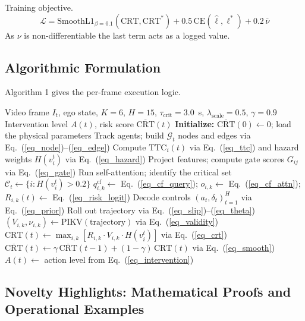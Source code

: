 \documentclass[preprint,12pt]{elsarticle}
\begin{document}
Training objective.
\begin{equation}
    \mathcal{L} = \text{SmoothL1}_{\beta = 0.1}(\text{CRT}, \text{CRT}^{*}) + 0.5 \, \text{CE}(\hat{\ell}, \ell^{*}) + 0.2 \, \overline{\nu}
    \label{eq_loss}
\end{equation}
As $\nu$ is non-differentiable the last term acts as a logged value.

\subsection{Algorithmic Formulation}
Algorithm 1 gives the per-frame execution logic.

\begin{algorithm}[H]
	\caption{PC-CSG Counterfactual Anomaly Anticipation Pipeline}
	\begin{algorithmic}[1]
		\Require Video frame $I_t$, ego state, $K=6$, $H=15$, $\tau_{\text{crit}}=3.0$~s, $\lambda_{\text{scale}}=0.5$, $\gamma = 0.9$
		\Ensure Intervention level $A(t)$, risk score $\overline{\text{CRT}}(t)$
		\State \textbf{Initialize:} $\overline{\text{CRT}}(0) \gets 0$; load the physical parameters
			\State Track agents; build $\mathcal{G}_t$ nodes and edges via Eq.~(\ref{eq_node})--(\ref{eq_edge})
			\State Compute $\text{TTC}_i(t)$ via Eq.~(\ref{eq_ttc}) and hazard weights $H(v_i^t)$ via Eq.~(\ref{eq_hazard})
			\State Project features; compute gate scores $G_{ij}$ via Eq.~(\ref{eq_gate})
			\State Run self-attention; identify the critical set $\mathcal{C}_t \gets \{i : H(v_i^t) > 0.2\}$
				\State ${q}_{i,k}^{\text{cf}} \gets$ Eq.~(\ref{eq_cf_query}); \; ${o}_{i,k} \gets$ Eq.~(\ref{eq_cf_attn}); \; $R_{i,k}(t) \gets$ Eq.~(\ref{eq_risk_logit})
				\State Decode controls $(a_t, \delta_t)_{t=1}^{H}$ via Eq.~(\ref{eq_prior})
				\State Roll out trajectory via Eq.~(\ref{eq_slip})--(\ref{eq_theta})
				\State $(V_{i,k}, \nu_{i,k}) \gets \text{PIKV}(\text{trajectory})$ via Eq.~(\ref{eq_validity})
			\EndFor
			\State $\text{CRT}(t) \gets \max_{i,k} [R_{i,k} \cdot V_{i,k} \cdot H(v_i^t)]$ via Eq.~(\ref{eq_crt})
			\State $\overline{\text{CRT}}(t) \gets \gamma \, \overline{\text{CRT}}(t-1) + (1-\gamma) \, \text{CRT}(t)$ via Eq.~(\ref{eq_smooth})
			\State $A(t) \gets$ action level from Eq.~(\ref{eq_intervention})
		\EndFor
	\end{algorithmic}
	\label{algo1}
\end{algorithm}

\subsection{Novelty Highlights: Mathematical Proofs and Operational Examples}
\end{document}
